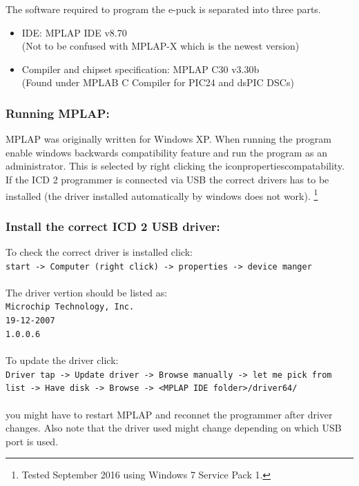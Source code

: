 \documentclass{article}
\newcommand{\stt}[1]{{\small\tt #1}}
\begin{document}
The software required to program the e-puck is separated into three parts. 
\begin{itemize}
\item IDE: MPLAP IDE v8.70 \\ (Not to be confused with MPLAP-X which is the newest version)
\item Compiler and chipset specification: MPLAP C30 v3.30b \\ (Found under MPLAB C Compiler for PIC24 and dsPIC DSCs)
\end{itemize}

\subsubsection*{Running MPLAP:}
MPLAP was originally written for Windows XP.  
When running the program enable windows backwards compatibility feature and run the program as an administrator. This is selected by right clicking the icon\textrightarrow properties\textrightarrow compatability.
If the ICD 2 programmer is connected via USB the correct drivers has to be installed (the driver installed automatically by windows does not work).
\footnote{Tested September 2016 using Windows 7 Service Pack 1.}

\subsubsection*{Install the correct ICD 2 USB driver:}
To check the correct driver is installed click:\\
\stt{start -> Computer (right click) -> properties -> device manger}
\\\\\noindent
The driver vertion should be listed as: \\
\stt{Microchip Technology, Inc.}\\
\stt{19-12-2007}\\
\stt{1.0.0.6}
\\\\\noindent
To update the driver click: \\
\stt{Driver tap -> Update driver -> Browse manually -> let me pick from list -> Have disk -> Browse -> <MPLAP IDE folder>/driver64/}
\\\\\noindent
you might have to restart MPLAP and reconnet the programmer after driver changes. 
Also note that the driver used might change depending on which USB port is used. 
\end{document}
